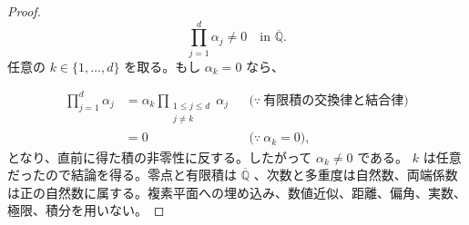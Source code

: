 \documentclass[11pt,a4paper]{article}
\theoremstyle{remark}
\begin{document}
\begin{proof}
\[\prod_{j=1}^{d}\alpha_j\ne0
\quad\text{in }\overline{\mathbb Q}.\]
任意の 
$k\in\{1,\ldots,d\}$
 を取る。もし 
$\alpha_k=0$
 なら、

\[\begin{aligned}
\prod_{j=1}^{d}\alpha_j
&=
\alpha_k\prod_{\substack{1\le j\le d\\j\ne k}}\alpha_j
&&\bigl(\because\ \text{有限積の交換律と結合律}\bigr)\\
&=
0
&&\bigl(\because\ \alpha_k=0\bigr),
\end{aligned}\]
となり、直前に得た積の非零性に反する。したがって 
$\alpha_k\ne0$
 である。
$k$
 は任意だったので結論を得る。零点と有限積は 
$\overline{\mathbb Q}$
、次数と多重度は自然数、両端係数は正の自然数に属する。複素平面への埋め込み、数値近似、距離、偏角、実数、極限、積分を用いない。

\end{proof}
\end{document}
